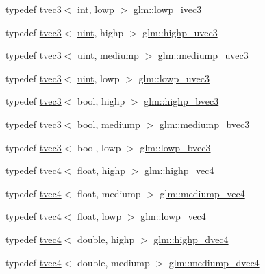 \begin{DoxyCompactItemize}
typedef \hyperlink{structglm_1_1tvec3}{tvec3}$<$ int, lowp $>$ \hyperlink{group__core__precision_gad03cd497aea76c671fda2ce1d697e905}{glm\+::lowp\+\_\+ivec3}
\item 
typedef \hyperlink{structglm_1_1tvec3}{tvec3}$<$ \hyperlink{group__core__precision_ga4fd29415871152bfb5abd588334147c8}{uint}, highp $>$ \hyperlink{group__core__precision_ga90ab9c4694f5af23c7dcd4eb9e47e255}{glm\+::highp\+\_\+uvec3}
\item 
typedef \hyperlink{structglm_1_1tvec3}{tvec3}$<$ \hyperlink{group__core__precision_ga4fd29415871152bfb5abd588334147c8}{uint}, mediump $>$ \hyperlink{group__core__precision_ga628d87a2d3b8e287d569c6eb12d8e051}{glm\+::mediump\+\_\+uvec3}
\item 
typedef \hyperlink{structglm_1_1tvec3}{tvec3}$<$ \hyperlink{group__core__precision_ga4fd29415871152bfb5abd588334147c8}{uint}, lowp $>$ \hyperlink{group__core__precision_gab6f49c51783c774550f5217aecabd1d9}{glm\+::lowp\+\_\+uvec3}
\item 
typedef \hyperlink{structglm_1_1tvec3}{tvec3}$<$ bool, highp $>$ \hyperlink{group__core__precision_gac35c0ff5b9eead09e905b4aa09d1e954}{glm\+::highp\+\_\+bvec3}
\item 
typedef \hyperlink{structglm_1_1tvec3}{tvec3}$<$ bool, mediump $>$ \hyperlink{group__core__precision_ga39d35dfb49fff9cf4a6458d8027d2a8b}{glm\+::mediump\+\_\+bvec3}
\item 
typedef \hyperlink{structglm_1_1tvec3}{tvec3}$<$ bool, lowp $>$ \hyperlink{group__core__precision_ga9ebdb78c611619993b9d5b182010529d}{glm\+::lowp\+\_\+bvec3}
\item 
typedef \hyperlink{structglm_1_1tvec4}{tvec4}$<$ float, highp $>$ \hyperlink{group__core__precision_ga5f573b0132805b54cb9205eea1c86483}{glm\+::highp\+\_\+vec4}
\item 
typedef \hyperlink{structglm_1_1tvec4}{tvec4}$<$ float, mediump $>$ \hyperlink{group__core__precision_ga3e0bdf70b43f0c2863ad9f0fe7da9476}{glm\+::mediump\+\_\+vec4}
\item 
typedef \hyperlink{structglm_1_1tvec4}{tvec4}$<$ float, lowp $>$ \hyperlink{group__core__precision_gabb82786cbefa101e9eb0cff63cecb1f2}{glm\+::lowp\+\_\+vec4}
\item 
typedef \hyperlink{structglm_1_1tvec4}{tvec4}$<$ double, highp $>$ \hyperlink{group__core__precision_ga2bb20b4bd180746b93577bc57f4b2b9d}{glm\+::highp\+\_\+dvec4}
\item 
typedef \hyperlink{structglm_1_1tvec4}{tvec4}$<$ double, mediump $>$ \hyperlink{group__core__precision_gaf685121e70f851b16581c154d8b27679}{glm\+::mediump\+\_\+dvec4}

\end{DoxyCompactItemize}
